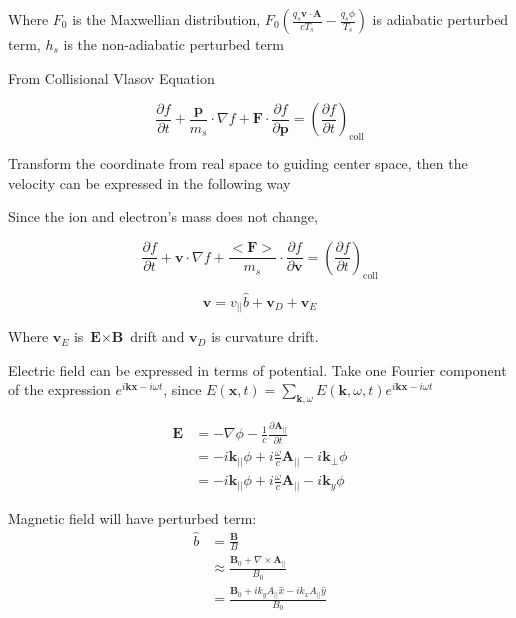 Where $F_0$ is the Maxwellian distribution, $F_0\left(\frac{q_s\textbf{v}\cdot \textbf{A}}{cT_s}-\frac{q_s\phi}{T_s} \right)$ is adiabatic perturbed term, $h_s$ is the non-adiabatic perturbed term

From Collisional Vlasov Equation

\begin{equation}
\frac{\partial f}{\partial t}+\frac{\mathbf{p}}{m_s} \cdot \nabla f+\mathbf{F} \cdot \frac{\partial f}{\partial \mathbf{p}}=\left(\frac{\partial f}{\partial t}\right)_{\mathrm{coll}}
\end{equation}

Transform the coordinate from real space to guiding center space, then the velocity can be expressed in the following way

Since the ion and electron's mass does not change,

\begin{equation}
\frac{\partial f}{\partial t}+\mathbf{v} \cdot \nabla f+
\frac{<\mathbf{F}>}{m_s} \cdot \frac{\partial f}{\partial \mathbf{v}}=\left(\frac{\partial f}{\partial t}\right)_{\mathrm{coll}}
\label{eq:Vlasov}
\end{equation}

\begin{equation}
    \textbf{v}=v_{||}\hat{b}+\textbf{v}_D+\textbf{v}_E
\end{equation}

Where $\textbf{v}_E$ is $\textbf{E}\times \textbf{B}$ drift and $\textbf{v}_D$ is curvature drift.

Electric field can be expressed in terms of potential. Take one Fourier component of the expression $e^{i\textbf{kx}-i\omega t}$, since $E(\textbf{x},t)=\sum_{\textbf{k}, \omega} E(\textbf{k},\omega, t)e^{i\textbf{kx}-i\omega t}$

\begin{equation}
    \begin{aligned}
        \mathbf{E}{}&=-\nabla \phi- \frac{1}{c}\frac{\partial \mathbf{A}_{ \|}}{\partial t}\\
        &=-i\textbf{k}_{||}\phi +i\frac{\omega}{c}\textbf{A}_{||}-i\textbf{k}_{\perp}\phi\\
        &=-i\textbf{k}_{||}\phi +i\frac{\omega}{c} \textbf{A}_{||}-i\textbf{k}_{y}\phi
    \end{aligned}
\end{equation}

Magnetic field will have perturbed term:
\begin{equation}
    \begin{aligned}
       \hat{b}{}&=\frac{\textbf{B}}{B}\\
       &\approx\frac{\textbf{B}_0+\nabla \times \textbf{A}_{||}}{B_0}\\
       &= \frac{\textbf{B}_0+ik_yA_{||}\hat{x}-ik_xA_{||}\hat{y}
       }{B_0}
    \end{aligned}
\end{equation}

